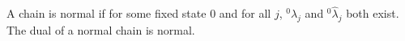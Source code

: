 A chain is normal if for some fixed state $0$ and for all $j$, ${}^0\lambda_j$ and ${}^0\hat{\lambda}_j$ both exist. The dual of a normal chain is normal.
